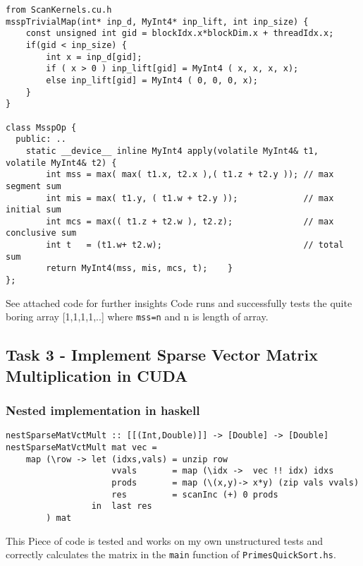 \documentclass[a4paper,10pt]{article}
\begin{document}
\begin{verbatim}
from ScanKernels.cu.h
msspTrivialMap(int* inp_d, MyInt4* inp_lift, int inp_size) {
    const unsigned int gid = blockIdx.x*blockDim.x + threadIdx.x;
    if(gid < inp_size) {
        int x = inp_d[gid];
        if ( x > 0 ) inp_lift[gid] = MyInt4 ( x, x, x, x);
        else inp_lift[gid] = MyInt4 ( 0, 0, 0, x);
    }
}

class MsspOp {
  public: ..
    static __device__ inline MyInt4 apply(volatile MyInt4& t1, volatile MyInt4& t2) {
        int mss = max( max( t1.x, t2.x ),( t1.z + t2.y )); // max segment sum
        int mis = max( t1.y, ( t1.w + t2.y ));             // max initial sum
        int mcs = max(( t1.z + t2.w ), t2.z);              // max conclusive sum
        int t   = (t1.w+ t2.w);                            // total sum
        return MyInt4(mss, mis, mcs, t);    }     
};
\end{verbatim}
See attached code for further insights
Code runs and successfully tests the quite boring array [1,1,1,1,..] where \texttt{mss=n} and n is length of array.


\newpage
\subsection{Task 3 - Implement Sparse Vector Matrix Multiplication in CUDA}

\subsubsection{Nested implementation in haskell}
\begin{verbatim}
nestSparseMatVctMult :: [[(Int,Double)]] -> [Double] -> [Double]
nestSparseMatVctMult mat vec =
    map (\row -> let (idxs,vals) = unzip row
                     vvals       = map (\idx ->  vec !! idx) idxs
                     prods       = map (\(x,y)-> x*y) (zip vals vvals)
                     res         = scanInc (+) 0 prods
                 in  last res
        ) mat
\end{verbatim}

This Piece of code is tested and works on my own unstructured tests and correctly calculates the matrix in the \texttt{main} function of \texttt{PrimesQuickSort.hs}.
\end{document}
